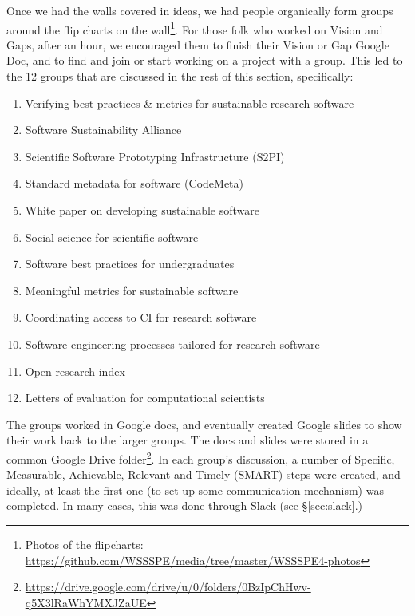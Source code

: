 \documentclass[11pt, oneside]{amsart}
\newcommand{\todo}[1]{{\color{blue}$\blacksquare$~\textsf{[TODO: #1]}}}
\begin{document}
Once we had the walls covered in ideas, we had people organically form groups around the flip charts on the wall\footnote{Photos of the flipcharts: \url{https://github.com/WSSSPE/media/tree/master/WSSSPE4-photos}}. For those folk who worked on Vision and Gaps, after an hour, we encouraged them to finish their Vision or Gap Google Doc, and to find and join or start working on a project with a group. This led to the 12 groups that are discussed in the rest of this section, specifically:
\begin{enumerate}
\item Verifying best practices \& metrics for sustainable research software
\item Software Sustainability Alliance
\item Scientific Software Prototyping Infrastructure (S2PI)
\item Standard metadata for software (CodeMeta)
\item White paper on developing sustainable software
\item Social science for scientific software
\item Software best practices for undergraduates
\item Meaningful metrics for sustainable software
\item Coordinating access to CI for research software
\item Software engineering processes tailored for research software
\item Open research index
\item Letters of evaluation for computational scientists
\end{enumerate}


The groups worked in Google docs, and eventually created Google slides to show their work back to the larger groups. The docs and slides were stored in a common Google Drive folder\footnote{\url{https://drive.google.com/drive/u/0/folders/0BzIpChHwv-q5X3lRaWhYMXJZaUE}}. In each group's discussion, a number of Specific, Measurable, Achievable, Relevant and Timely (SMART) steps were created, and ideally, at least the first one (to set up some communication mechanism) was completed.  In many cases, this was done through Slack (see \S\ref{sec:slack}.)















\end{document}
